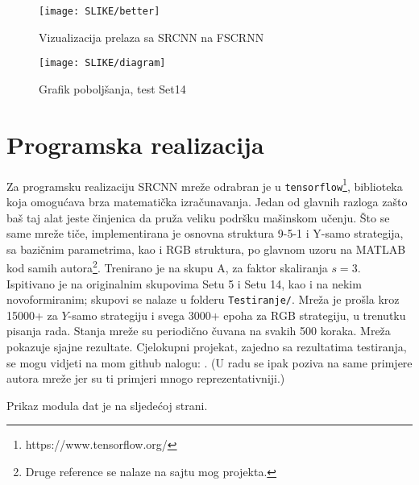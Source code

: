 \documentclass[12pt]{report}
\numberwithin{equation}{section}
\begin{document}
 \begin{figure}[h]
\texttt{[image: SLIKE/better]}
\centering
\caption{Vizualizacija prelaza sa SRCNN na FSCRNN}
\label{fig:improv_1}
\end{figure}

\begin{figure}[h]
\texttt{[image: SLIKE/diagram]}
\centering
\caption{Grafik poboljšanja, test Set14}
\label{fig:improv_2}
\end{figure} 
 
        
   

\chapter{Programska realizacija}\label{ch2}
 
 
  Za programsku realizaciju SRCNN mreže odrabran je u \texttt{tensorflow}\footnote{https://www.tensorflow.org/}, biblioteka koja omogućava brza matematička izračunavanja. Jedan od glavnih razloga zašto baš taj alat jeste činjenica da pruža veliku podršku mašinskom učenju.
  Što se same mreže tiče, implementirana je osnovna struktura 9-5-1 i Y-samo strategija, sa bazičnim parametrima, kao i RGB struktura, po glavnom uzoru na MATLAB kod samih autora\footnote{Druge reference se nalaze na sajtu mog projekta.}. Trenirano je na skupu A, za faktor skaliranja $s=3$. Ispitivano je na originalnim skupovima Setu 5 i Setu 14, kao i na nekim novoformiranim; skupovi se nalaze u folderu \texttt{Testiranje/}.  Mreža je prošla kroz 15000+ za $Y$-samo strategiju i svega 3000+ epoha za RGB strategiju, u trenutku pisanja rada. Stanja mreže su periodično čuvana na svakih 500 koraka. Mreža pokazuje sjajne rezultate. Cjelokupni projekat, zajedno sa rezultatima testiranja, se mogu vidjeti na mom github nalogu: \cite{samples}. (U radu se ipak poziva na same primjere autora mreže jer su ti primjeri mnogo reprezentativniji.)
 
 
 
 Prikaz modula dat je na sljedećoj strani.

\newpage
  
\end{document}
